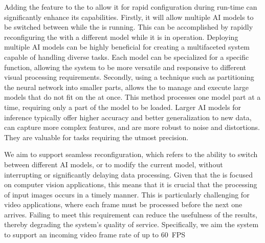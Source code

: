 
Adding the feature to the \graicore{} to allow it for rapid configuration during run-time can significantly enhance its capabilities.
Firstly, it will allow multiple AI models to be switched between while the \graicore{} is running.
This can be accomplished by rapidly reconfiguring the \graicore{} with a different model while it is in operation.
Deploying multiple AI models can be highly beneficial for creating a multifaceted system capable of handling diverse tasks.
Each model can be specialized for a specific function, allowing the system to be more versatile and responsive to different visual processing requirements.
Secondly, using a technique such as partitioning the neural network into smaller parts, allows the \graicore{} to manage and execute large models that do not fit on the \graicore{} at once.
This method processes one model part at a time, requiring only a part of the model to be loaded.
Larger AI models for inference typically offer higher accuracy and better generalization to new data, can capture more complex features, and are more robust to noise and distortions.
They are valuable for tasks requiring the utmost precision.

We aim to support seamless reconfiguration, which refers to the ability to switch between different AI models, or to modify the current model, without interrupting or significantly delaying data processing.
Given that the \graicore{} is focused on computer vision applications, this means that it is crucial that the processing of input images occurs in a timely manner.
This is particularly challenging for video applications, where each frame must be processed before the next one arrives.
Failing to meet this requirement can reduce the usefulness of the results, thereby degrading the system's quality of service.
Specifically, we aim the system to support an incoming video frame rate of up to \SI{60}{FPS}

